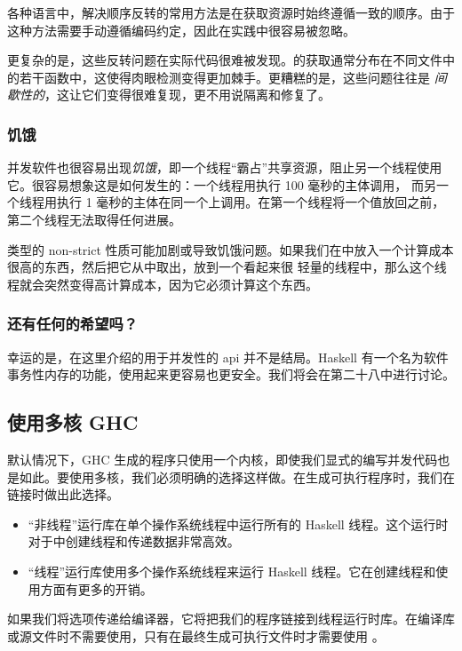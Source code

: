 \documentclass[./main.tex]{subfiles}
\begin{document}
各种语言中，解决顺序反转的常用方法是在获取资源时始终遵循一致的顺序。由于这种方法需要手动遵循编码约定，因此在实践中很容易被忽略。

更复杂的是，这些反转问题在实际代码很难被发现。的获取通常分布在不同文件中的若干函数中，这使得肉眼检测变得更加棘手。更糟糕的是，这些问题往往是
\textit{间歇性的}，这让它们变得很难复现，更不用说隔离和修复了。

\subsubsection*{饥饿}

并发软件也很容易出现\textit{饥饿}，即一个线程“霸占”共享资源，阻止另一个线程使用它。很容易想象这是如何发生的：一个线程用执行 100 毫秒的主体调用，
而另一个线程用执行 1 毫秒的主体在同一个上调用。在第一个线程将一个值放回之前，第二个线程无法取得任何进展。

类型的 non-strict 性质可能加剧或导致饥饿问题。如果我们在中放入一个计算成本很高的东西，然后把它从中取出，放到一个看起来很
轻量的线程中，那么这个线程就会突然变得高计算成本，因为它必须计算这个东西。

\subsubsection*{还有任何的希望吗？}

幸运的是，在这里介绍的用于并发性的 api 并不是结局。Haskell 有一个名为软件事务性内存的功能，使用起来更容易也更安全。我们将会在第二十八中进行讨论。

\subsection*{使用多核 GHC}

默认情况下，GHC 生成的程序只使用一个内核，即使我们显式的编写并发代码也是如此。要使用多核，我们必须明确的选择这样做。在生成可执行程序时，我们在链接时做出此选择。

\begin{itemize}
  \item “非线程”运行库在单个操作系统线程中运行所有的 Haskell 线程。这个运行时对于中创建线程和传递数据非常高效。
  \item “线程”运行库使用多个操作系统线程来运行 Haskell 线程。它在创建线程和使用方面有更多的开销。
\end{itemize}

如果我们将选项传递给编译器，它将把我们的程序链接到线程运行时库。在编译库或源文件时不需要使用，只有在最终生成可执行文件时才需要使用
。
\end{document}
